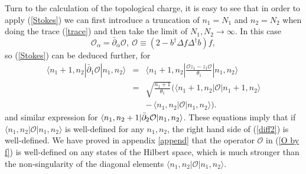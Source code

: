 \documentclass[a4paper,a4paper]{article}
\begin{document}
Turn to the calculation of the topological charge, it is easy to see that in
order to apply (\ref{Stokes}) we can first introduce a truncation of $%
n_{1}=N_{1}$ and $n_{2}=N_{2}$ when doing the trace (\ref{trace}) and then
take the limit of $N_{1},N_{2}\rightarrow \infty $. In this case%
\begin{equation}
\mathcal{O}_{\alpha }=\bar{\partial}_{\alpha }\mathcal{O},\
\mathcal{O\equiv }(2-b^{\dag }\Delta f\Delta ^{\dag }b)f, \label{O
by f}
\end{equation}%
so (\ref{Stokes}) can be deduced further, for%
\begin{eqnarray}
\langle
n_{1}+1,n_{2}|\bar{\partial}_{1}\mathcal{O}|n_{1},n_{2}\rangle
&=&\langle n_{1}+1,n_{2}|\frac{\mathcal{O}z_{1}-z_{1}\mathcal{O}}{\theta _{1}%
}|n_{1},n_{2}\rangle  \nonumber \\
&=&\sqrt{\frac{n_{1}+1}{\theta _{1}}}(\langle n_{1}+1,n_{2}|\mathcal{O}%
|n_{1}+1,n_{2}\rangle  \label{diff} \\
&&-\,\langle n_{1},n_{2}|\mathcal{O}|n_{1},n_{2}\rangle).
\nonumber
\end{eqnarray}%
and similar expression for $\langle n_{1},n_{2}+1|\bar{\partial}_{2}\mathcal{%
O}|n_{1},n_{2}\rangle $. These equations imply that if $\langle
n_{1},n_{2}|\mathcal{O}|n_{1},n_{2}\rangle$ is well-defined for
any $n_{1},n_{2}$, the right hand side of (\ref{diff2}) is
well-defined. We have proved in appendix \ref{append} that the
operator $\mathcal{O}$ in (\ref{O by f}) is well-defined on any
states of the Hilbert space, which is much stronger than the
non-singularity of the diagonal elements $\langle
n_{1},n_{2}|\mathcal{O}|n_{1},n_{2}\rangle$.
\end{document}
